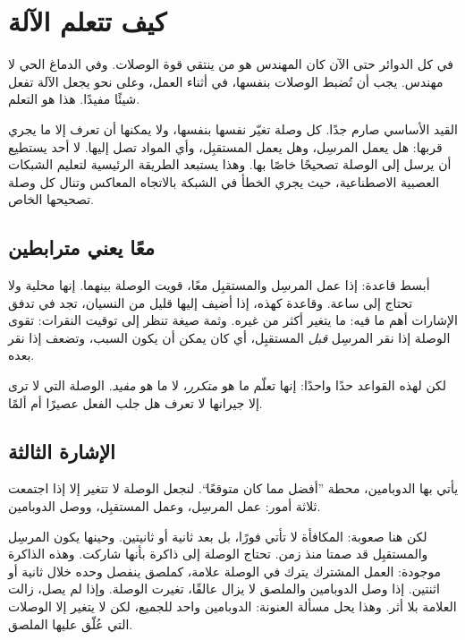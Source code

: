 \chapter{كيف تتعلم الآلة}

في كل الدوائر حتى الآن كان المهندس هو من ينتقي قوة الوصلات. وفي الدماغ الحي لا مهندس. يجب أن تُضبط الوصلات بنفسها، في أثناء العمل، وعلى نحو يجعل الآلة تفعل شيئًا مفيدًا. هذا هو التعلم.

القيد الأساسي صارم جدًا. كل وصلة تغيّر نفسها بنفسها، ولا يمكنها أن تعرف إلا ما يجري قربها: هل يعمل المرسِل، وهل يعمل المستقبِل، وأي المواد تصل إليها. لا أحد يستطيع أن يرسل إلى الوصلة تصحيحًا خاصًا بها. وهذا يستبعد الطريقة الرئيسية لتعليم الشبكات العصبية الاصطناعية، حيث يجري الخطأ في الشبكة بالاتجاه المعاكس وتنال كل وصلة تصحيحها الخاص.

\section*{معًا يعني مترابطين}

أبسط قاعدة: إذا عمل المرسِل والمستقبِل معًا، قويت الوصلة بينهما. إنها محلية ولا تحتاج إلى ساعة. وقاعدة كهذه، إذا أضيف إليها قليل من النسيان، تجد في تدفق الإشارات أهم ما فيه: ما يتغير أكثر من غيره. وثمة صيغة تنظر إلى توقيت النقرات: تقوى الوصلة إذا نقر المرسِل \emph{قبل} المستقبِل، أي كان يمكن أن يكون السبب، وتضعف إذا نقر بعده.

لكن لهذه القواعد حدًا واحدًا: إنها تعلّم ما هو \emph{متكرر}، لا ما هو \emph{مفيد}. الوصلة التي لا ترى إلا جيرانها لا تعرف هل جلب الفعل عصيرًا أم ألمًا.

\section*{الإشارة الثالثة}

يأتي بها الدوبامين، محطة ”أفضل مما كان متوقعًا“. لنجعل الوصلة لا تتغير إلا إذا اجتمعت ثلاثة أمور: عمل المرسِل، وعمل المستقبِل، ووصل الدوبامين.


لكن هنا صعوبة: المكافأة لا تأتي فورًا، بل بعد ثانية أو ثانيتين. وحينها يكون المرسِل والمستقبِل قد صمتا منذ زمن. تحتاج الوصلة إلى ذاكرة بأنها شاركت. وهذه الذاكرة موجودة: العمل المشترك يترك في الوصلة علامة، كملصق ينفصل وحده خلال ثانية أو اثنتين. إذا وصل الدوبامين والملصق لا يزال عالقًا، تغيرت الوصلة. وإذا لم يصل، زالت العلامة بلا أثر. وهذا يحل مسألة العنونة: الدوبامين واحد للجميع، لكن لا يتغير إلا الوصلات التي عُلّق عليها الملصق.

